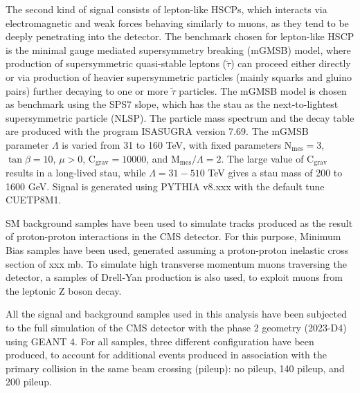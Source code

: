 \documentclass[11pt,twoside,a4paper]{article}
\begin{document}
The second kind of signal consists of lepton-like HSCPs, which interacts via electromagnetic and weak forces behaving similarly to muons, as they tend to be deeply penetrating into the detector.
The benchmark chosen for lepton-like HSCP is the minimal gauge mediated supersymmetry breaking (mGMSB) model, where production of supersymmetric quasi-stable leptons ($\tilde{\tau}$) can proceed either directly or via production of heavier supersymmetric particles (mainly squarks and gluino pairs) further decaying to one or more $\tilde{\tau}$ particles.
The mGMSB model is chosen as benchmark using the SPS7 slope, which has the stau as the next-to-lightest supersymmetric particle (NLSP). 
The particle mass spectrum and the decay table are produced with the program ISASUGRA version 7.69. The mGMSB parameter $\Lambda$ is varied from 31 to
160 TeV, with fixed parameters $\mathrm{N}_{\mathrm{mes}} = 3$, $\tan \beta = 10$, $\mu > 0$, $\mathrm{C}_{\mathrm{grav}} = 10000$, and $\mathrm{M}_{\mathrm{mes}}/\Lambda = 2$. 
The large value of $\mathrm{C}_{\mathrm{grav}}$ results in a long-lived stau, while $\Lambda = 31-510$ TeV gives a stau mass of 200 to 1600 GeV. 
Signal is generated using PYTHIA v8.xxx with the default tune CUETP8M1.

SM background samples have been used to simulate tracks produced as the result of proton-proton interactions in the CMS detector.
For this purpose, Minimum Bias samples have been used, generated assuming a proton-proton inelastic cross section of xxx mb.
To simulate high transverse momentum muons traversing the detector, a samples of Drell-Yan production is also used, to exploit muons from the leptonic Z boson decay.

All the signal and background samples used in this analysis have been subjected to the full simulation of the CMS detector with the phase 2 geometry (2023-D4) using GEANT 4. 
For all samples, three different configuration have been produced, to account for additional events produced in association with the primary collision in the same beam crossing (pileup): no pileup, 140 pileup, and 200 pileup.
\end{document}
